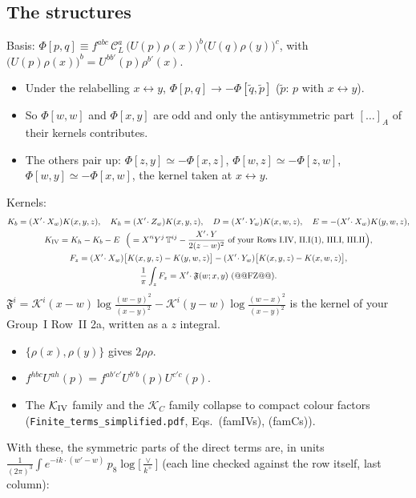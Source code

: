 \documentclass[10pt]{article}
\numberwithin{equation}{section}
\newcommand{\KK}{\mathcal K}
\newcommand{\CL}{\mathcal C_L}
\newcommand{\Lv}{\log\Big[\frac{\vee}{k^+}\Big]}
\newcommand{\pre}{\frac{1}{(2\pi)^3}}
\newcommand{\phw}{e^{-ik\cdot(w'-w)}}
\begin{document}
\subsection{The structures}
Basis: $\Phi[p,q]\equiv f^{abc}\,\CL^a\,\big(U(p)\rho(x)\big)^b\big(U(q)\rho(y)\big)^c$, with $\big(U(p)\rho(x)\big)^b=U^{bb'}(p)\rho^{b'}(x)$.
\begin{itemize}
\item Under the relabelling $x\leftrightarrow y$, $\Phi[p,q]\to-\Phi[\tilde q,\tilde p]$ ($\tilde p$: $p$ with $x\leftrightarrow y$).
\item So $\Phi[w,w]$ and $\Phi[x,y]$ are odd and only the antisymmetric part $[\dots]_A$ of their kernels contributes.
\item The others pair up: $\Phi[z,y]\simeq-\Phi[x,z]$, $\Phi[w,z]\simeq-\Phi[z,w]$, $\Phi[w,y]\simeq-\Phi[x,w]$, the kernel taken at $x\leftrightarrow y$.
\end{itemize}
Kernels:
\begin{gather*}
K_b=(X'\!\cdot X_w)K(x,y,z),\quad K_h=(X'\!\cdot Z_w)K(x,y,z),\quad D=(X'\!\cdot Y_w)K(x,w,z),\quad E=-(X'\!\cdot X_w)K(y,w,z),\\
K_{\rm IV}=K_h-K_b-E\ \ \Big(=X'^iY^j\,\mathbb T^{ij}-\frac{X'\!\cdot Y}{2(z-w)^2}\text{ of your Rows I.IV, II.I(1), III.I, III.II}\Big),\\
F_z=(X'\!\cdot X_w)\big[K(x,y,z)-K(y,w,z)\big]-(X'\!\cdot Y_w)\big[K(x,y,z)-K(x,w,z)\big],\\
\frac1\pi\int_zF_z=X'\!\cdot\mathfrak F(w;x,y)\ \text{(@@FZ@@)}.
\end{gather*}
$\mathfrak F^i=\KK^i(x-w)\log\frac{(w-y)^2}{(x-y)^2}-\KK^i(y-w)\log\frac{(w-x)^2}{(x-y)^2}$ is the kernel of your Group~I Row~II 2a, written as a $z$ integral.
\begin{itemize}
\item $\{\rho(x),\rho(y)\}$ gives $2\rho\rho$.
\item $f^{hbc}U^{ah}(p)=f^{ab'c'}U^{b'b}(p)U^{c'c}(p)$.
\item The $\KK_{\rm IV}$ family and the $\KK_C$ family collapse to compact colour factors (\texttt{Finite\_terms\_simplified.pdf}, Eqs.~(famIVs), (famCs)).
\end{itemize}
With these, the symmetric parts of the direct terms are, in units $\pre\int\phw\,p_8\Lv$ (each line checked against the row itself, last column):
\end{document}
